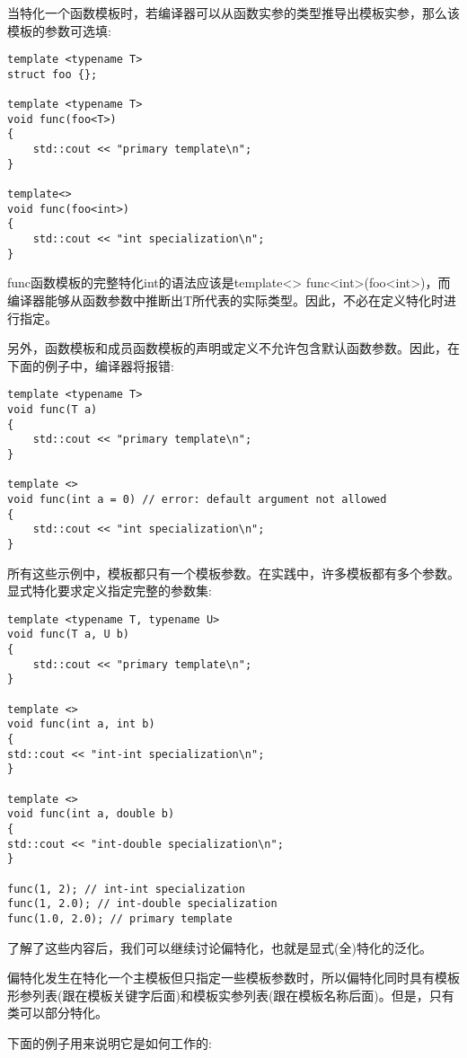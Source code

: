当特化一个函数模板时，若编译器可以从函数实参的类型推导出模板实参，那么该模板的参数可选填:

\begin{lstlisting}[style=styleCXX]
template <typename T>
struct foo {};

template <typename T>
void func(foo<T>)
{
	std::cout << "primary template\n";
}

template<>
void func(foo<int>)
{
	std::cout << "int specialization\n";
}
\end{lstlisting}

func函数模板的完整特化int的语法应该是template<> func<int>(foo<int>)，而编译器能够从函数参数中推断出T所代表的实际类型。因此，不必在定义特化时进行指定。

另外，函数模板和成员函数模板的声明或定义不允许包含默认函数参数。因此，在下面的例子中，编译器将报错:

\begin{lstlisting}[style=styleCXX]
template <typename T>
void func(T a)
{
	std::cout << "primary template\n";
}

template <>
void func(int a = 0) // error: default argument not allowed
{
	std::cout << "int specialization\n";
}
\end{lstlisting}

所有这些示例中，模板都只有一个模板参数。在实践中，许多模板都有多个参数。显式特化要求定义指定完整的参数集:

\begin{lstlisting}[style=styleCXX]
template <typename T, typename U>
void func(T a, U b)
{
	std::cout << "primary template\n";
}

template <>
void func(int a, int b)
{
std::cout << "int-int specialization\n";
}

template <>
void func(int a, double b)
{
std::cout << "int-double specialization\n";
}

func(1, 2); // int-int specialization
func(1, 2.0); // int-double specialization
func(1.0, 2.0); // primary template
\end{lstlisting}

了解了这些内容后，我们可以继续讨论偏特化，也就是显式(全)特化的泛化。


偏特化发生在特化一个主模板但只指定一些模板参数时，所以偏特化同时具有模板形参列表(跟在模板关键字后面)和模板实参列表(跟在模板名称后面)。但是，只有类可以部分特化。

下面的例子用来说明它是如何工作的:

